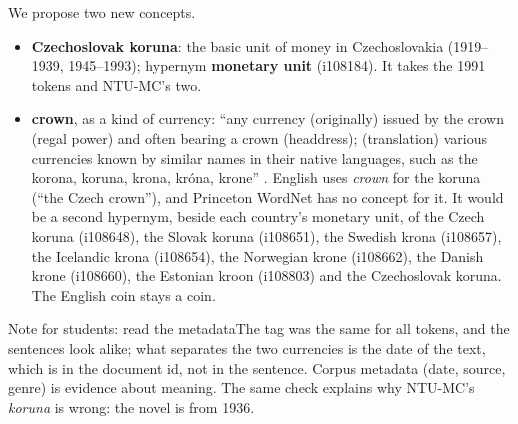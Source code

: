 \documentclass[a4paper,12pt]{article}
\newcommand{\aside}[2]{\begin{asidebox}{#1}\small #2\end{asidebox}}
\begin{document}
We propose two new concepts.
\begin{itemize}
\item \textbf{Czechoslovak koruna}: the basic unit of money in
  Czechoslovakia (1919--1939, 1945--1993); hypernym \textbf{monetary
  unit} (i108184).  It takes the 1991 tokens and NTU-MC's two.
\item \textbf{crown}, as a kind of currency: ``any currency (originally)
  issued by the crown (regal power) and often bearing a crown
  (headdress); (translation) various currencies known by similar names in
  their native languages, such as the korona, koruna, krona, króna,
  krone'' \citep{wiktionary-crown}.  English uses \textit{crown} for the
  koruna (``the Czech crown''), and Princeton WordNet has no concept for
  it.  It would be a second hypernym, beside each country's monetary
  unit, of the Czech koruna (i108648), the Slovak koruna (i108651), the
  Swedish krona (i108657), the Icelandic krona (i108654), the Norwegian
  krone (i108662), the Danish krone (i108660), the Estonian kroon
  (i108803) and the Czechoslovak koruna.  The English coin stays a coin.
\end{itemize}

\aside{Note for students: read the metadata}{The tag was the same for all
\fact{ntu.relinked.koruna.all} tokens, and the sentences look alike; what
separates the two currencies is the date of the text, which is in the
document id, not in the sentence.  Corpus metadata (date, source, genre)
is evidence about meaning.  The same check explains why NTU-MC's
\textit{koruna} is wrong: the novel is from 1936.}


\end{document}
